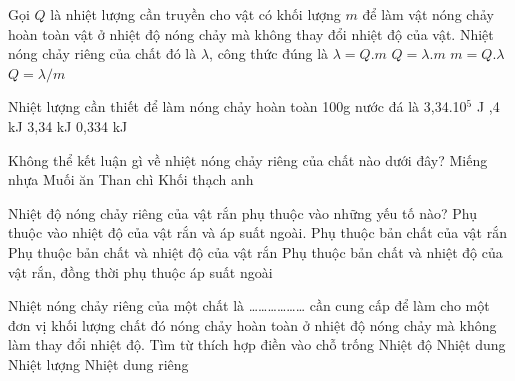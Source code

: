 \begin{ex}
Gọi $Q$ là nhiệt lượng cần truyền cho vật có khối lượng $m$ để làm vật nóng chảy hoàn toàn vật ở nhiệt độ nóng chảy mà không thay đổi nhiệt độ của vật. Nhiệt nóng chảy riêng của chất đó là $\lambda$, công thức đúng là
\choice
{$\lambda = Q.m$}
{\True $Q = \lambda.m$}
{$m = Q.\lambda$}
{$Q = \lambda/m$}
\end{ex}

\begin{ex}
Nhiệt lượng cần thiết để làm nóng chảy hoàn toàn 100g nước đá là
\choice
{3,34.10$^5$ J}
{,4 kJ}
{3,34 kJ}
{0,334 kJ}
\end{ex}

\begin{ex}
Không thể kết luận gì về nhiệt nóng chảy riêng của chất nào dưới đây?
\choice
{\True Miếng nhựa}
{Muối ăn}
{Than chì}
{Khối thạch anh}
\end{ex}

\begin{ex}
Nhiệt độ nóng chảy riêng của vật rắn phụ thuộc vào những yếu tố nào?
\choice
{Phụ thuộc vào nhiệt độ của vật rắn và áp suất ngoài.}
{\True Phụ thuộc bản chất của vật rắn}
{Phụ thuộc bản chất và nhiệt độ của vật rắn}
{Phụ thuộc bản chất và nhiệt độ của vật rắn, đồng thời phụ thuộc áp suất ngoài}
\end{ex}

\begin{ex}
Nhiệt nóng chảy riêng của một chất là ……………… cần cung cấp để làm cho một đơn vị khối lượng chất đó nóng chảy hoàn toàn ở nhiệt độ nóng chảy mà không làm thay đổi nhiệt độ. Tìm từ thích hợp điền vào chỗ trống
\choice
{Nhiệt độ}
{Nhiệt dung}
{\True Nhiệt lượng}
{Nhiệt dung riêng}
\end{ex}

